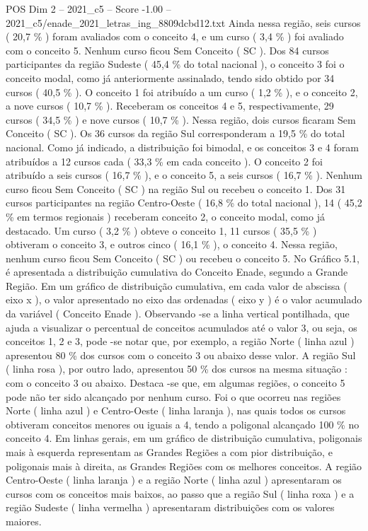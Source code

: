 \begin{textsample}{POS Dim 2 – 2021\_c5 – Score -1.00 – 2021\_c5/enade\_2021\_letras\_ing\_8809dcbd12.txt}
Ainda nessa região, seis cursos ( 20,7 \% ) foram avaliados com o conceito 4, e um curso ( 3,4 \% ) foi avaliado com o conceito 5.
Nenhum curso ficou Sem Conceito ( SC ).
Dos 84 cursos participantes da região Sudeste ( 45,4 \% do total nacional ), o conceito 3 foi o conceito modal, como já anteriormente assinalado, tendo sido obtido por 34 cursos ( 40,5 \% ).
O conceito 1 foi atribuído a um curso ( 1,2 \% ), e o conceito 2, a nove cursos ( 10,7 \% ).
Receberam os conceitos 4 e 5, respectivamente, 29 cursos ( 34,5 \% ) e nove cursos ( 10,7 \% ).
Nessa região, dois cursos ficaram Sem Conceito ( SC ).
Os 36 cursos da região Sul corresponderam a 19,5 \% do total nacional.
Como já indicado, a distribuição foi bimodal, e os conceitos 3 e 4 foram atribuídos a 12 cursos cada ( 33,3 \% em cada conceito ).
O conceito 2 foi atribuído a seis cursos ( 16,7 \% ), e o conceito 5, a seis cursos ( 16,7 \% ).
Nenhum curso ficou Sem Conceito ( SC ) na região Sul ou recebeu o conceito 1.
Dos 31 cursos participantes na região Centro-Oeste ( 16,8 \% do total nacional ), 14 ( 45,2 \% em termos regionais ) receberam conceito 2, o conceito modal, como já destacado.
Um curso ( 3,2 \% ) obteve o conceito 1, 11 cursos ( 35,5 \% ) obtiveram o conceito 3, e outros cinco ( 16,1 \% ), o conceito 4.
Nessa região, nenhum curso ficou Sem Conceito ( SC ) ou recebeu o conceito 5.
No Gráfico 5.1, é apresentada a distribuição cumulativa do Conceito Enade, segundo a Grande Região.
Em um gráfico de distribuição cumulativa, em cada valor de abscissa ( eixo x ), o valor apresentado no eixo das ordenadas ( eixo y ) é o valor acumulado da variável ( Conceito Enade ).
Observando -se a linha vertical pontilhada, que ajuda a visualizar o percentual de conceitos acumulados até o valor 3, ou seja, os conceitos 1, 2 e 3, pode -se notar que, por exemplo, a região Norte ( linha azul ) apresentou 80 \% dos cursos com o conceito 3 ou abaixo desse valor.
A região Sul ( linha rosa ), por outro lado, apresentou 50 \% dos cursos na mesma situação : com o conceito 3 ou abaixo.
Destaca -se que, em algumas regiões, o conceito 5 pode não ter sido alcançado por nenhum curso.
Foi o que ocorreu nas regiões Norte ( linha azul ) e Centro-Oeste ( linha laranja ), nas quais todos os cursos obtiveram conceitos menores ou iguais a 4, tendo a poligonal alcançado 100 \% no conceito 4.
Em linhas gerais, em um gráfico de distribuição cumulativa, poligonais mais à esquerda representam as Grandes Regiões a com pior distribuição, e poligonais mais à direita, as Grandes Regiões com os melhores conceitos.
A região Centro-Oeste ( linha laranja ) e a região Norte ( linha azul ) apresentaram os cursos com os conceitos mais baixos, ao passo que a região Sul ( linha roxa ) e a região Sudeste ( linha vermelha ) apresentaram distribuições com os valores maiores.

\end{textsample}
